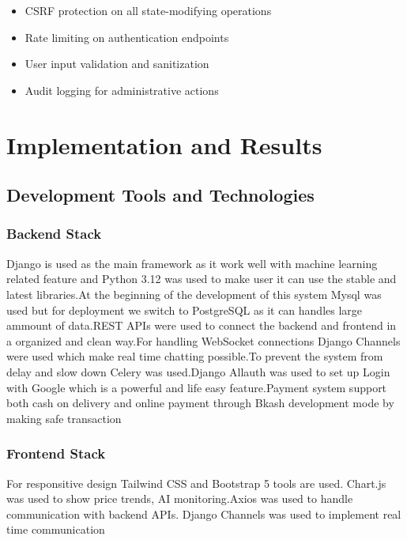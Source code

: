 \documentclass[12pt,a4paper]{report}
\begin{document}
\begin{itemize}
    \item CSRF protection on all state-modifying operations
    \item Rate limiting on authentication endpoints
    \item User input validation and sanitization
    \item Audit logging for administrative actions
\end{itemize}

\newpage

\chapter{Implementation and Results}

\section{Development Tools and Technologies}

\subsection{Backend Stack}


	Django is used as the main framework as it work well with machine learning related feature and Python 3.12 was used to make user it can use the stable and latest libraries.At the beginning of the development of this system Mysql was used but for deployment we switch to PostgreSQL as it can handles large ammount of data.REST APIs were used to connect the backend and frontend in a organized and clean way.For handling WebSocket connections Django Channels were used which make real time chatting possible.To prevent the system from delay and slow down Celery was used.Django Allauth was used to set up Login with Google which is a powerful and life easy feature.Payment system support both cash on delivery and online payment through Bkash development mode by making safe transaction


\subsection{Frontend Stack}
	For responsitive design Tailwind CSS and Bootstrap 5 tools are used. Chart.js was used to show price trends, AI monitoring.Axios was used to handle communication with backend APIs. Django Channels was used to implement real time communication
\end{document}

